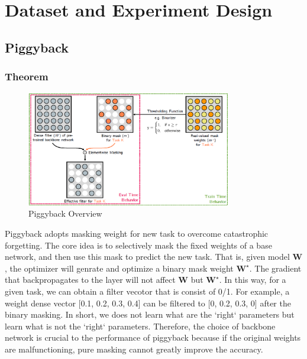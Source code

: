 \section{Dataset and Experiment Design}
\subsection{Piggyback}
\subsubsection{Theorem}
\begin{figure}
  \centering
  \includegraphics[width=0.8\textwidth]{figure/piggyback.png}
  \caption{Piggyback Overview}
  \label{piggy}
\end{figure}

Piggyback adopts masking weight for new task to overcome catastrophic forgetting. The core idea is to selectively mask the fixed weights of a base network, and then use this mask to predict the new task. That is, given model $\mathbf{W}$, the optimizer will genrate and optimize a binary mask weight $\mathbf{W}^\star$. The gradient that backpropagates to the layer will not affect $\mathbf{W}$ but $\mathbf{W}^{\star}$. In this way, for a given task, we can obtain a filter vecotor that is consist of 0/1. For example, a weight dense vector [0.1, 0.2, 0.3, 0.4] can be filtered to [0, 0.2, 0.3, 0] after the binary masking. In short, we does not learn what are the `right` parameters but learn what is not the `right` parameters. Therefore, the choice of backbone network is crucial to the performance of piggyback because if the original weights are malfunctioning, pure masking cannot greatly improve the accuracy.

